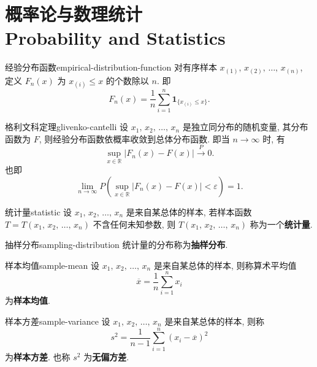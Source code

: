 \section{概率论与数理统计 \\Probability and Statistics}

\begin{newdefbox}{经验分布函数}{empirical-distribution-function}
	对有序样本 $x_{(1)},\,x_{(2)},\,\dots,\,x_{(n)}$, 定义 $F_n(x)$ 为 $x_{(i)}\leq x$ 的个数除以 $n$.  即
	\[
		F_n(x)=\frac{1}{n}\sum_{i=1}^n\mathbf{1}_{\{x_{(i)}\leq x\}}.
		\]
\end{newdefbox}

\begin{newtheorembox}{格利文科定理}{glivenko-cantelli}
	设 $x_1,\,x_2,\,\dots,\,x_n$ 是独立同分布的随机变量, 其分布函数为 $F$, 则经验分布函数依概率收敛到总体分布函数.  即当 $n\to\infty$ 时, 有
	\[
		\sup_{x\in\mathbb{R}}|F_n(x)-F(x)|\xrightarrow{P}0.
	\]
	也即
	\[
		\lim_{n\to\infty}P\left(\sup_{x\in\mathbb{R}}|F_n(x)-F(x)|<\varepsilon\right)=1.
	\]
\end{newtheorembox}

\begin{newdefbox}{统计量}{statistic}
	设 $x_1,\,x_2,\,\dots,\,x_n$ 是来自某总体的样本, 若样本函数 $T=T(x_1,\,x_2,\,\dots,\,x_n)$ 不含任何未知参数, 则 $T(x_1,\,x_2,\,\dots,\,x_n)$ 称为一个\textbf{统计量}.
\end{newdefbox}

\begin{newdefbox}{抽样分布}{sampling-distribution}
	统计量的分布称为\textbf{抽样分布}.
\end{newdefbox}

\begin{newdefbox}{样本均值}{sample-mean}
	设 $x_1,\,x_2,\,\dots,\,x_n$ 是来自某总体的样本, 则称算术平均值
	\[
		\overline{x}=\frac{1}{n}\sum_{i=1}^nx_i
	\]
	为\textbf{样本均值}.
\end{newdefbox}

\begin{newdefbox}{样本方差}{sample-variance}
	设 $x_1,\,x_2,\,\dots,\,x_n$ 是来自某总体的样本, 则称
	\[
		s^2=\frac{1}{n-1}\sum_{i=1}^n(x_i-\overline{x})^2
	\]
	为\textbf{样本方差}.  也称 $s^2$ 为\textbf{无偏方差}.
\end{newdefbox}

